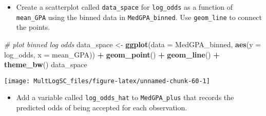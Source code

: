 \documentclass[]{book}
\newenvironment{Shaded}{\begin{snugshade}}{\end{snugshade}}
\newcommand{\KeywordTok}[1]{\textcolor[rgb]{0.13,0.29,0.53}{\textbf{#1}}}
\newcommand{\DataTypeTok}[1]{\textcolor[rgb]{0.13,0.29,0.53}{#1}}
\newcommand{\DecValTok}[1]{\textcolor[rgb]{0.00,0.00,0.81}{#1}}
\newcommand{\StringTok}[1]{\textcolor[rgb]{0.31,0.60,0.02}{#1}}
\newcommand{\CommentTok}[1]{\textcolor[rgb]{0.56,0.35,0.01}{\textit{#1}}}
\newcommand{\OperatorTok}[1]{\textcolor[rgb]{0.81,0.36,0.00}{\textbf{#1}}}
\newcommand{\NormalTok}[1]{#1}
\providecommand{\tightlist}{%
  \setlength{\itemsep}{0pt}\setlength{\parskip}{0pt}}
\begin{document}
\begin{Shaded}
\end{Shaded}

\begin{itemize}
\tightlist
\item
  Create a scatterplot called \texttt{data\_space} for
  \texttt{log\_odds} as a function of \texttt{mean\_GPA} using the
  binned data in \texttt{MedGPA\_binned}. Use \texttt{geom\_line} to
  connect the points.
\end{itemize}

\begin{Shaded}
\begin{Highlighting}[]
\CommentTok{# plot binned log odds}
\NormalTok{data_space <-}\StringTok{ }\KeywordTok{ggplot}\NormalTok{(}\DataTypeTok{data =}\NormalTok{ MedGPA_binned, }
\KeywordTok{aes}\NormalTok{(}\DataTypeTok{y =}\NormalTok{ log_odds, }\DataTypeTok{x =}\NormalTok{ mean_GPA)) }\OperatorTok{+}\StringTok{ }
\StringTok{    }\KeywordTok{geom_point}\NormalTok{() }\OperatorTok{+}
\StringTok{    }\KeywordTok{geom_line}\NormalTok{() }\OperatorTok{+}\StringTok{ }
\StringTok{    }\KeywordTok{theme_bw}\NormalTok{()}
\NormalTok{data_space}
\end{Highlighting}
\end{Shaded}

\begin{center}\texttt{[image: MultLogSC\_files/figure-latex/unnamed-chunk-60-1]} \end{center}

\begin{itemize}
\tightlist
\item
  Add a variable called \texttt{log\_odds\_hat} to \texttt{MedGPA\_plus}
  that records the predicted odds of being accepted for each
  observation.
\end{itemize}

\begin{Shaded}
\end{Shaded}
\end{document}
